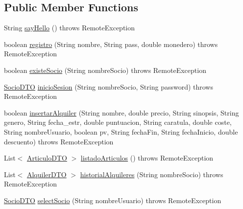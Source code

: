 \subsection*{Public Member Functions}
\begin{DoxyCompactItemize}
\item 
String \mbox{\hyperlink{classes_1_1deusto_1_1server_1_1remote_1_1_server_a37ccd2be0b3fbf0a80b356f132eca048}{say\+Hello}} ()  throws Remote\+Exception 
\item 
boolean \mbox{\hyperlink{classes_1_1deusto_1_1server_1_1remote_1_1_server_abd8ccf5305f02831be069dd3b53a3b5d}{registro}} (String nombre, String pass, double monedero)  throws Remote\+Exception 
\item 
boolean \mbox{\hyperlink{classes_1_1deusto_1_1server_1_1remote_1_1_server_aba00b1ee900945e8004bc285d00a8c95}{existe\+Socio}} (String nombre\+Socio)  throws Remote\+Exception 
\item 
\mbox{\hyperlink{classes_1_1deusto_1_1server_1_1dto_1_1_socio_d_t_o}{Socio\+D\+TO}} \mbox{\hyperlink{classes_1_1deusto_1_1server_1_1remote_1_1_server_a9202d46c169e1920b585990f1adba486}{inicio\+Sesion}} (String nombre\+Socio, String password)  throws Remote\+Exception 
\item 
boolean \mbox{\hyperlink{classes_1_1deusto_1_1server_1_1remote_1_1_server_ae4892ba5e855e921d156a4b49562424c}{insertar\+Alquiler}} (String nombre, double precio, String sinopsis, String genero, String fecha\+\_\+estr, double puntuacion, String caratula, double coste, String nombre\+Usuario, boolean pv, String fecha\+Fin, String fecha\+Inicio, double descuento)  throws Remote\+Exception 	
\item 
List$<$ \mbox{\hyperlink{classes_1_1deusto_1_1server_1_1dto_1_1_articulo_d_t_o}{Articulo\+D\+TO}} $>$ \mbox{\hyperlink{classes_1_1deusto_1_1server_1_1remote_1_1_server_af92422f6c88a176f9f424f3d9016ee00}{listado\+Articulos}} ()  throws Remote\+Exception 
\item 
List$<$ \mbox{\hyperlink{classes_1_1deusto_1_1server_1_1dto_1_1_alquiler_d_t_o}{Alquiler\+D\+TO}} $>$ \mbox{\hyperlink{classes_1_1deusto_1_1server_1_1remote_1_1_server_a6aba80b9dc49313f765f5720aa4ae2a7}{historial\+Alquileres}} (String nombre\+Socio)  throws Remote\+Exception 
\item 
\mbox{\hyperlink{classes_1_1deusto_1_1server_1_1dto_1_1_socio_d_t_o}{Socio\+D\+TO}} \mbox{\hyperlink{classes_1_1deusto_1_1server_1_1remote_1_1_server_ab26aaf2d539feae12e21a4f6328886a4}{select\+Socio}} (String nombre\+Usuario)  throws Remote\+Exception 

\end{DoxyCompactItemize}
